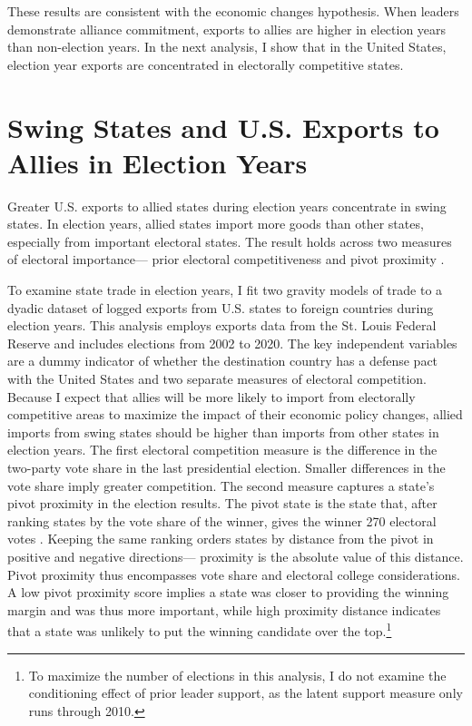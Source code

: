 \documentclass[12pt]{article}
\begin{document}
These results are consistent with the economic changes hypothesis. 
When leaders demonstrate alliance commitment, exports to allies are higher in election years than non-election years.
In the next analysis, I show that in the United States, election year exports are concentrated in electorally competitive states.



\section{Swing States and U.S. Exports to Allies in Election Years}


Greater U.S. exports to allied states during election years concentrate in swing states.
In election years, allied states import more goods than other states, especially from important electoral states.
The result holds across two measures of electoral importance--- prior electoral competitiveness and pivot proximity \citep{Wright2009}.


To examine state trade in election years, I fit two gravity models of trade to a dyadic dataset of logged exports from U.S. states to foreign countries during election years.
This analysis employs exports data from the St. Louis Federal Reserve and includes elections from 2002 to 2020.
The key independent variables are a dummy indicator of whether the destination country has a defense pact with the United States and two separate measures of electoral competition. 
Because I expect that allies will be more likely to import from electorally competitive areas to maximize the impact of their economic policy changes, allied imports from swing states should be higher than imports from other states in election years. 
The first electoral competition measure is the difference in the two-party vote share in the last presidential election.
Smaller differences in the vote share imply greater competition.
The second measure captures a state's pivot proximity in the election results. 
The pivot state is the state that, after ranking states by the vote share of the winner, gives the winner 270 electoral votes \citep{Wright2009}.
Keeping the same ranking orders states by distance from the pivot in positive and negative directions--- proximity is the absolute value of this distance. 
Pivot proximity thus encompasses vote share and electoral college considerations. 
A low pivot proximity score implies a state was closer to providing the winning margin and was thus more important, while high proximity distance indicates that a state was unlikely to put the winning candidate over the top.\footnote{To maximize the number of elections in this analysis, I do not examine the conditioning effect of prior leader support, as the latent support measure only runs through 2010.} 
\end{document}
